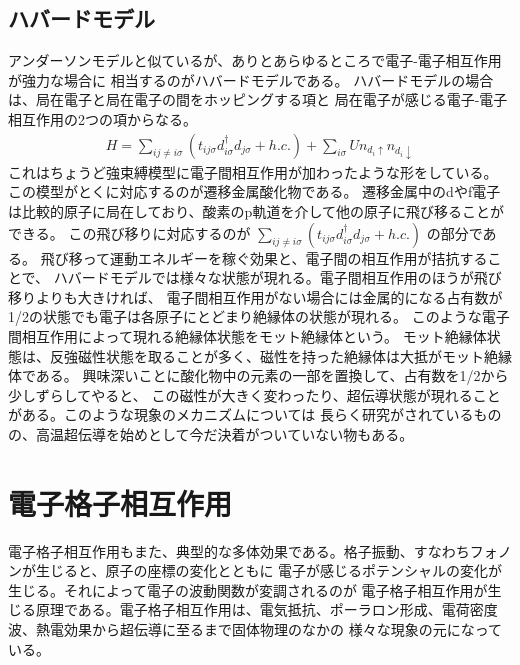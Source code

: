 \documentclass[letterpaper,10pt,dvipdfmx]{sphinxhowto}
\begin{document}
\subsection{ハバードモデル}
\label{\detokenize{index:id5}}
アンダーソンモデルと似ているが、ありとあらゆるところで電子-電子相互作用が強力な場合に
相当するのがハバードモデルである。
ハバードモデルの場合は、局在電子と局在電子の間をホッピングする項と
局在電子が感じる電子-電子相互作用の2つの項からなる。
\begin{equation*}
\begin{split}H=\sum_{i j\neq i\sigma}( t_{ij\sigma} d_{i\sigma}^\dagger d_{j\sigma}+h.c.) +\sum_{i\sigma}Un_{d_i\uparrow}n_{d_i\downarrow}\end{split}
\end{equation*}
これはちょうど強束縛模型に電子間相互作用が加わったような形をしている。
この模型がとくに対応するのが遷移金属酸化物である。
遷移金属中のdやf電子は比較的原子に局在しており、酸素のp軌道を介して他の原子に飛び移ることができる。
この飛び移りに対応するのが
\(\sum_{i j\neq i\sigma}( t_{ij\sigma} d_{i\sigma}^\dagger d_{j\sigma}+h.c.)\)
の部分である。
飛び移って運動エネルギーを稼ぐ効果と、電子間の相互作用が拮抗することで、
ハバードモデルでは様々な状態が現れる。電子間相互作用のほうが飛び移りよりも大きければ、
電子間相互作用がない場合には金属的になる占有数が1/2の状態でも電子は各原子にとどまり絶縁体の状態が現れる。
このような電子間相互作用によって現れる絶縁体状態をモット絶縁体という。
モット絶縁体状態は、反強磁性状態を取ることが多く、磁性を持った絶縁体は大抵がモット絶縁体である。
興味深いことに酸化物中の元素の一部を置換して、占有数を1/2から少しずらしてやると、
この磁性が大きく変わったり、超伝導状態が現れることがある。このような現象のメカニズムについては
長らく研究がされているものの、高温超伝導を始めとして今だ決着がついていない物もある。


\section{電子格子相互作用}
\label{\detokenize{index:id6}}
電子格子相互作用もまた、典型的な多体効果である。格子振動、すなわちフォノンが生じると、原子の座標の変化とともに
電子が感じるポテンシャルの変化が生じる。それによって電子の波動関数が変調されるのが
電子格子相互作用が生じる原理である。電子格子相互作用は、電気抵抗、ポーラロン形成、電荷密度波、熱電効果から超伝導に至るまで固体物理のなかの
様々な現象の元になっている。
\end{document}
